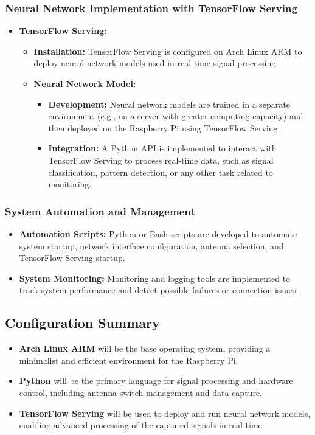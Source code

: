 \documentclass{article}
\begin{document}
\subsubsection{Neural Network Implementation with TensorFlow Serving}
\begin{itemize}
    \item \textbf{TensorFlow Serving:}
    \begin{itemize}
        \item \textbf{Installation:} TensorFlow Serving is configured on Arch Linux ARM to deploy neural network models used in real-time signal processing.
        \item \textbf{Neural Network Model:}
        \begin{itemize}
            \item \textbf{Development:} Neural network models are trained in a separate environment (e.g., on a server with greater computing capacity) and then deployed on the Raspberry Pi using TensorFlow Serving.
            \item \textbf{Integration:} A Python API is implemented to interact with TensorFlow Serving to process real-time data, such as signal classification, pattern detection, or any other task related to monitoring.
        \end{itemize}
    \end{itemize}
\end{itemize}

\subsubsection{System Automation and Management}
\begin{itemize}
    \item \textbf{Automation Scripts:} Python or Bash scripts are developed to automate system startup, network interface configuration, antenna selection, and TensorFlow Serving startup.
    \item \textbf{System Monitoring:} Monitoring and logging tools are implemented to track system performance and detect possible failures or connection issues.
\end{itemize}

\subsection{Configuration Summary}

\begin{itemize}
    \item \textbf{Arch Linux ARM} will be the base operating system, providing a minimalist and efficient environment for the Raspberry Pi.
    \item \textbf{Python} will be the primary language for signal processing and hardware control, including antenna switch management and data capture.
    \item \textbf{TensorFlow Serving} will be used to deploy and run neural network models, enabling advanced processing of the captured signals in real-time.
\end{itemize}
\end{document}
